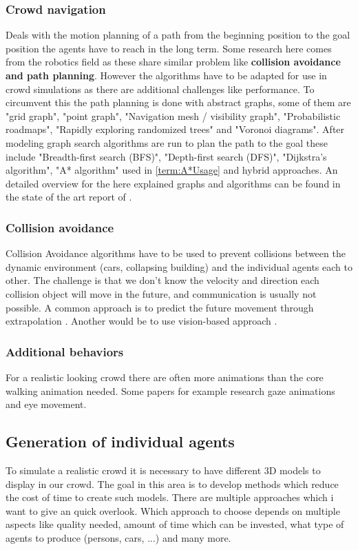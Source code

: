 \documentclass{acmsiggraph}               %
\begin{document}
\subsubsection{Crowd navigation}
Deals with the motion planning of a path from the beginning position to the goal position the agents have to reach in the long term. Some research here comes from the robotics field as these share similar problem like \textbf{collision avoidance and path planning}. However the algorithms have to be adapted for use in crowd simulations as there are additional challenges like performance. To circumvent this the path planning is done with abstract graphs, some of them are "grid graph", "point graph", "Navigation mesh / visibility graph", "Probabilistic roadmaps", "Rapidly exploring randomized trees" and "Voronoi diagrams". After modeling graph search algorithms are run to plan the path to the goal these include "Breadth-ﬁrst search (BFS)",  "Depth-ﬁrst search (DFS)", "Dijkstra’s algorithm", "A* algorithm" used in \ref{term:A*Usage} and hybrid approaches. An detailed overview for the here explained graphs and algorithms can be found in the state of the art report of \cite{jaros_crowd_2014}. 

\subsubsection{Collision avoidance}
Collision Avoidance algorithms have to be used to prevent collisions between the dynamic environment (cars, collapsing building) and the individual agents each to other. The challenge is that we don't know the velocity and direction each collision object will move in the future, and communication is usually not possible. A common approach is to predict the future movement through extrapolation \cite{karamouzas_predictive_2009}. Another would be to use vision-based approach \cite{ondrej_synthetic-vision_2010}.


\subsubsection{Additional behaviors}
For a realistic looking crowd there are often more animations than the core walking animation needed. Some papers for example research gaze animations and eye movement. 

\subsection{Generation of individual agents}
To simulate a realistic crowd it is necessary to have different 3D models to display in our crowd. The goal in this area is to develop methods which reduce the cost of time to create such models. There are multiple approaches which i want to give an quick overlook. Which approach to choose depends on multiple aspects like quality needed, amount of time which can be invested, what type of agents to produce (persons, cars, ...) and many more. 
\end{document}
